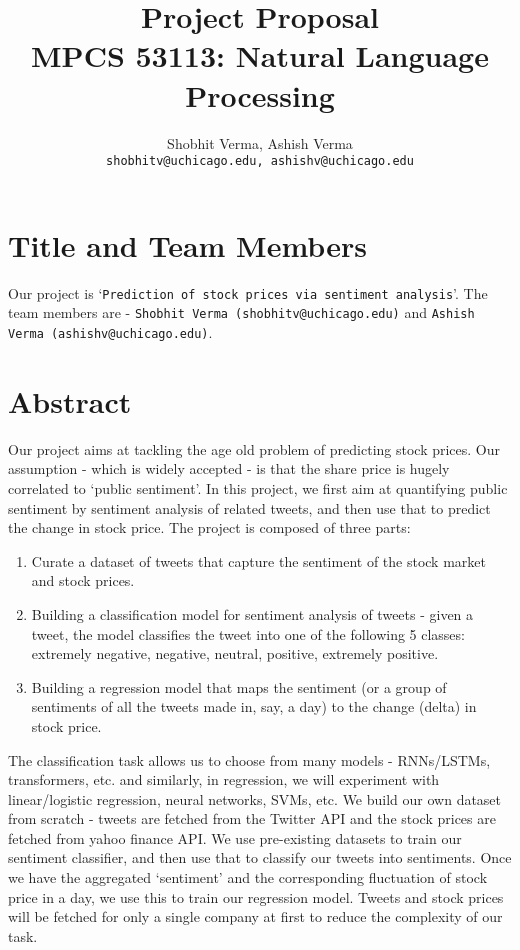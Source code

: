 \documentclass{article}
\title{Project Proposal\\MPCS 53113: Natural Language Processing}
\author{Shobhit Verma, Ashish Verma \\ \texttt{shobhitv@uchicago.edu, ashishv@uchicago.edu}}
\begin{document}
\maketitle

\section{Title and Team Members}
Our project is `\texttt{Prediction of stock prices via sentiment analysis}'. The team members are - \texttt{Shobhit Verma (shobhitv@uchicago.edu)} and \texttt{Ashish Verma (ashishv@uchicago.edu)}.

\section{Abstract}
    Our project aims at tackling the age old problem of predicting stock prices. Our assumption - which is widely accepted - is that the share price is hugely correlated to `public sentiment'. In this project, we first aim at quantifying public sentiment by sentiment analysis of related tweets, and then use that to predict the change in stock price. The project is composed of three parts:
    \begin{enumerate}
        \item Curate a dataset of tweets that capture the sentiment of the stock market and stock prices. 
        \item Building a classification model for sentiment analysis of tweets - given a tweet, the model classifies the tweet into one of the following 5 classes: extremely negative, negative, neutral, positive, extremely positive.
        \item Building a regression model that maps the sentiment (or a group of sentiments of all the tweets made in, say, a day) to the change (delta) in stock price.
    \end{enumerate}
    The classification task allows us to choose from many models - RNNs/LSTMs, transformers, etc. and similarly, in regression, we will experiment with linear/logistic regression, neural networks, SVMs, etc. We build our own dataset from scratch - tweets are fetched from the Twitter API and the stock prices are fetched from yahoo finance API. We use pre-existing datasets to train our sentiment classifier, and then use that to classify our tweets into sentiments. Once we have the aggregated `sentiment' and the corresponding fluctuation of stock price in a day, we use this to train our regression model. Tweets and stock prices will be fetched for only a single company at first to reduce the complexity of our task.
\end{document}

